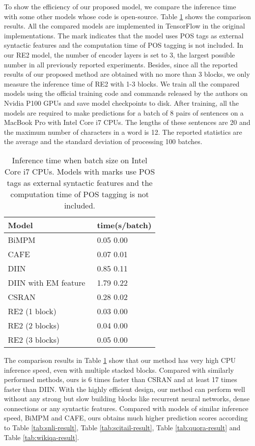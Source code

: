 \documentclass[11pt,a4paper]{article}
\begin{document}
To show the efficiency of our proposed model, we compare the inference time with some other models whose code is open-source. Table \ref{tab:inference-time} shows the comparison results. All the compared models are implemented in TensorFlow in the original implementations. The  mark indicates that the model uses POS tags as external syntactic features and the computation time of POS tagging is not included. In our RE2 model, the number of encoder layers is set to 3, the largest possible number in all previously reported experiments. Besides, since all the reported results of our proposed method are obtained with no more than 3 blocks, we only measure the inference time of RE2 with 1-3 blocks. We train all the compared models using the official training code and commands released by the authors on Nvidia P100 GPUs and save model checkpoints to disk. After training, all the models are required to make predictions for a batch of 8 pairs of sentences on a MacBook Pro with Intel Core i7 CPUs. The lengths of these sentences are 20 and the maximum number of characters in a word is 12. The reported statistics are the average and the standard deviation of processing 100 batches. 

\begin{table}
  \centering
  \small
  \begin{tabular}{|l|l|}
  \hline
  {\bf Model} & {\bf time(s/batch)}\\\hline
  BiMPM \cite{wang2017bilateral} & 0.05  0.00 \\
  CAFE \cite{tay2018compare} & 0.07  0.01 \\
  DIIN \cite{gong2018natural} & 0.85  0.11 \\
  DIIN with EM feature\ & 1.79  0.22 \\
  CSRAN \cite{tay2018co} & 0.28  0.02 \\\hline
  RE2 (1 block) &  0.03  0.00 \\
  RE2 (2 blocks) &  0.04  0.00 \\
  RE2 (3 blocks) &  0.05  0.00 \\\hline
  \end{tabular}
  \caption{Inference time when batch size  on Intel Core i7 CPUs. Models with  marks use POS tags as external syntactic features and the computation time of POS tagging is not included.}\label{tab:inference-time}
\end{table}

The comparison results in Table \ref{tab:inference-time} show that our method has very high CPU inference speed, even with multiple stacked blocks. Compared with similarly performed methods, ours is 6 times faster than CSRAN and at least 17 times faster than DIIN. With the highly efficient design, our method can perform well without any strong but slow building blocks like recurrent neural networks, dense connections or any syntactic features. Compared with models of similar inference speed, BiMPM and CAFE, ours obtains much higher prediction scores according to Table \ref{tab:snli-result}, Table \ref{tab:scitail-result}, Table \ref{tab:quora-result} and Table \ref{tab:wikiqa-result}. 
\end{document}
